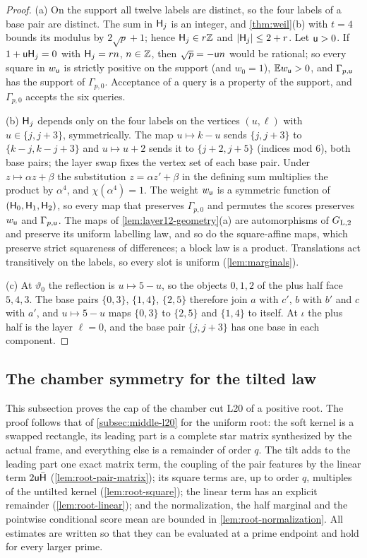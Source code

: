 \begin{proof}
(a) On the support all twelve labels are distinct, so the four labels of a base pair are
distinct. The sum in $\mathsf H_{j}$ is an integer, and \cref{thm:weil}(b) with $t=4$ bounds its
modulus by $2\sqrt p+1$; hence $\mathsf H_{j}\in r\mathbb Z$ and $|\mathsf H_{j}|\le2+r$. Let $\mathsf u>0$. If
$1+\mathsf u\mathsf H_{j}=0$ with $\mathsf H_{j}=rn$, $n\in\mathbb Z$, then $\sqrt p=-\mathsf u n$ would be rational;
so every square in $w_\mathsf u$ is strictly positive on the support (and
$w_0=1$), $\mathbb E w_\mathsf u>0$, and $\Gamma_{p,\mathsf u}$ has the support of $\Gamma_{p,0}$.
Acceptance of a query is a property of the support, and $\Gamma_{p,0}$ accepts the six
queries.

(b) $\mathsf H_{j}$ depends only on the four labels on the vertices $(u,\ell)$ with
$u\in\{j,j+3\}$, symmetrically. The map $u\mapsto k-u$ sends $\{j,j+3\}$ to
$\{k-j,k-j+3\}$ and $u\mapsto u+2$ sends it to $\{j+2,j+5\}$ (indices mod $6$), both base
pairs; the layer swap fixes the vertex set of each base pair. Under $z\mapsto\alpha z+\beta$
the substitution $z=\alpha z'+\beta$ in the defining sum multiplies the product by
$\alpha^4$, and $\chi(\alpha^4)=1$. The weight $w_\mathsf u$ is a symmetric function of
$(\mathsf H_{0},\mathsf H_{1},\mathsf H_{2})$, so every map that preserves $\Gamma_{p,0}$ and permutes the scores
preserves $w_\mathsf u$ and $\Gamma_{p,\mathsf u}$. The maps of \cref{lem:layer12-geometry}(a) are
automorphisms of $G_{\rm L,2}$ and preserve its uniform labelling law, and so do the
square-affine maps, which preserve strict squareness of differences; a block law is a
product. Translations act transitively on the labels, so every slot is uniform
(\cref{lem:marginals}).

(c) At $\vartheta_0$ the reflection is $u\mapsto5-u$, so the objects $0,1,2$ of the plus
half face $5,4,3$. The base pairs $\{0,3\}$, $\{1,4\}$, $\{2,5\}$ therefore join $a$
with $c'$, $b$ with $b'$ and $c$ with $a'$, and $u\mapsto5-u$ maps $\{0,3\}$ to $\{2,5\}$
and $\{1,4\}$ to itself. At $\iota$ the plus half is the layer $\ell=0$, and the base pair
$\{j,j+3\}$ has one base in each component.
\end{proof}

\subsection{The chamber symmetry for the tilted law}\label{subsec:positive-root-chamber}

This subsection proves the cap of the chamber cut L20 of a positive root. The proof
follows that of \cref{subsec:middle-l20} for the uniform root: the soft kernel is a
swapped rectangle, its leading part is a complete star matrix synthesized by the actual
frame, and everything else is a remainder of order $q$. The tilt adds to the leading
part one exact matrix term, the coupling of the pair features by the linear term
$2\mathsf u\bar{\mathsf H}$ (\cref{lem:root-pair-matrix}); its square terms are, up to order $q$,
multiples of the untilted kernel (\cref{lem:root-square}); the
linear term has an explicit remainder (\cref{lem:root-linear}); and the normalization,
the half marginal and the pointwise conditional score mean are bounded in
\cref{lem:root-normalization}. All estimates are written so that they can be evaluated
at a prime endpoint and hold for every larger prime.

